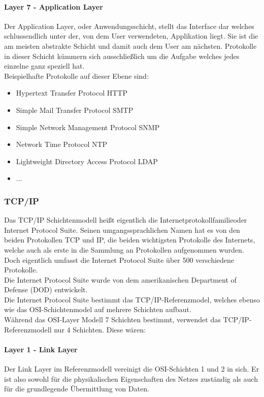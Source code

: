 \documentclass[11pt,a4paper]{report}
\begin{document}
\paragraph{Layer 7 - Application Layer}
Der Application Layer, oder Anwendungsschicht, stellt das Interface dar welches schlussendlich unter der, von dem User verwendeten, Applikation liegt. Sie ist die am meisten abstrakte Schicht und damit auch dem User am nächsten. Protokolle in dieser Schicht kümmern sich ausschließlich um die Aufgabe welches jedes einzelne ganz speziell hat.\\

Beispielhafte Protokolle auf dieser Ebene sind:
\begin{itemize}
\item Hypertext Transfer Protocol HTTP
\item Simple Mail Transfer Protocol SMTP
\item Simple Network Management Protocol SNMP
\item Network Time Protocol NTP
\item Lightweight Directory Access Protocol LDAP
\item ...
\end{itemize}
\subsubsection{TCP/IP}\label{sssec:tcpip}
Das TCP/IP Schichtenmodell heißt eigentlich die \glqq Internetprotokollfamilie\grqq oder \glqq Internet Protocol Suite\grqq . Seinen umgangssprachlichen Namen hat es von den beiden Protokollen TCP und IP, die beiden wichtigsten Protokolle des Internets, welche auch als erste in die Sammlung an Protokollen aufgenommen wurden. Doch eigentlich umfasst die Internet Protocol Suite über 500 verschiedene Protokolle.\\
Die Internet Protocol Suite wurde von dem amerikanischen Department of Defense (DOD) entwickelt.\\


Die Internet Protocol Suite bestimmt das TCP/IP-Referenzmodel, welches ebenso wie das OSI-Schichtenmodel auf mehrere Schichten aufbaut.\\
Während das OSI-Layer Modell 7 Schichten bestimmt, verwendet das TCP/IP-Referenzmodell nur 4 Schichten. Diese wären:\\

\paragraph{Layer 1 - Link Layer}
Der Link Layer im Referenzmodell vereinigt die OSI-Schichten 1 und 2 in sich. Er ist also sowohl für die physikalischen Eigenschaften des Netzes zuständig als auch für die grundlegende Übermittlung von Daten.
\end{document}
